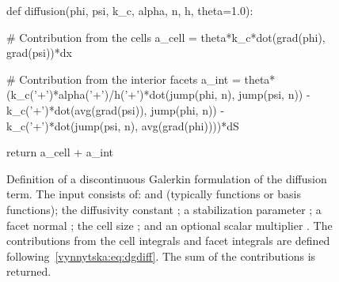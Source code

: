 \begin{figure}
  \begin{center}
    \begin{python}
def diffusion(phi, psi, k_c, alpha, n, h, theta=1.0):

    # Contribution from the cells
    a_cell = theta*k_c*dot(grad(phi), grad(psi))*dx

    # Contribution from the interior facets
    a_int = theta*(k_c('+')*alpha('+')/h('+')*dot(jump(phi, n), jump(psi, n))
                   - k_c('+')*dot(avg(grad(psi)), jump(phi, n))
                   - k_c('+')*dot(jump(psi, n), avg(grad(phi))))*dS

    return a_cell + a_int
    \end{python}
    \caption{Definition of a discontinuous Galerkin formulation of the
      diffusion term. The input consists of:  and 
      (typically functions or basis functions); the diffusivity
      constant ; a stabilization parameter ; a
      facet normal ; the cell size ; and an optional
      scalar multiplier . The contributions from the cell
      integrals and facet integrals are defined
      following~\eqref{vynnytska:eq:dgdiff}. The sum of the
      contributions is returned.}
    \label{vynnytska:fig:diffusion}
  \end{center}
\end{figure}

